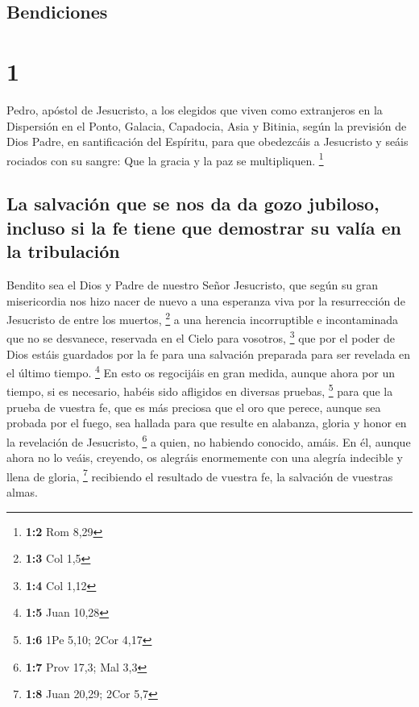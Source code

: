 \hypertarget{bendiciones}{%
\subsection{Bendiciones}\label{bendiciones}}

\hypertarget{section}{%
\section{1}\label{section}}

 Pedro, apóstol de Jesucristo, a los elegidos que viven
como extranjeros en la Dispersión en el Ponto, Galacia, Capadocia, Asia
y Bitinia,  según la previsión de Dios Padre, en
santificación del Espíritu, para que obedezcáis a Jesucristo y seáis
rociados con su sangre: Que la gracia y la paz se multipliquen.
\footnote{\textbf{1:2} Rom 8,29}

\hypertarget{la-salvaciuxf3n-que-se-nos-da-da-gozo-jubiloso-incluso-si-la-fe-tiene-que-demostrar-su-valuxeda-en-la-tribulaciuxf3n}{%
\subsection{La salvación que se nos da da gozo jubiloso, incluso si la
fe tiene que demostrar su valía en la
tribulación}\label{la-salvaciuxf3n-que-se-nos-da-da-gozo-jubiloso-incluso-si-la-fe-tiene-que-demostrar-su-valuxeda-en-la-tribulaciuxf3n}}

 Bendito sea el Dios y Padre de nuestro Señor Jesucristo,
que según su gran misericordia nos hizo nacer de nuevo a una esperanza
viva por la resurrección de Jesucristo de entre los muertos, \footnote{\textbf{1:3}
  Col 1,5}  a una herencia incorruptible e incontaminada
que no se desvanece, reservada en el Cielo para vosotros, \footnote{\textbf{1:4}
  Col 1,12}  que por el poder de Dios estáis guardados por
la fe para una salvación preparada para ser revelada en el último
tiempo. \footnote{\textbf{1:5} Juan 10,28}  En esto os
regocijáis en gran medida, aunque ahora por un tiempo, si es necesario,
habéis sido afligidos en diversas pruebas, \footnote{\textbf{1:6} 1Pe
  5,10; 2Cor 4,17}  para que la prueba de vuestra fe, que
es más preciosa que el oro que perece, aunque sea probada por el fuego,
sea hallada para que resulte en alabanza, gloria y honor en la
revelación de Jesucristo, \footnote{\textbf{1:7} Prov 17,3; Mal 3,3}
 a quien, no habiendo conocido, amáis. En él, aunque ahora
no lo veáis, creyendo, os alegráis enormemente con una alegría indecible
y llena de gloria, \footnote{\textbf{1:8} Juan 20,29; 2Cor 5,7}
 recibiendo el resultado de vuestra fe, la salvación de
vuestras almas.

